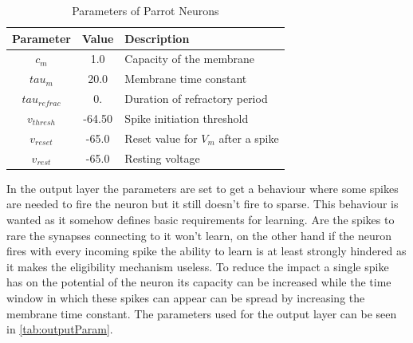 


      


\begin{table}[htpb]
\caption[Parameters Parrot Neuron]{Parameters of Parrot Neurons} \label{tab:parrotPar}
\centering
\begin{tabular}{|c| c |l|}
    \toprule
    Parameter & Value & Description \\
    \midrule
    $c_m$   & 1.0  & Capacity of the membrane \\
    $tau_{m}$    & 20.0  & Membrane time constant \\
    $tau_{refrac}$   & 0.  & Duration of refractory period\\
    $v_{thresh}$   & -64.50  & Spike initiation threshold \\
    $v_{reset}$    & -65.0  &  Reset value for $V_m$ after a spike \\
		$v_{rest}$ & -65.0 & Resting voltage \\
    \bottomrule
\end{tabular}
\end{table}

In the output layer the parameters are set to get a behaviour where some spikes are needed to fire the neuron but it still doesn’t fire to sparse. This behaviour is wanted as it somehow defines basic requirements for learning. Are the spikes to rare the synapses connecting to it won’t learn, on the other hand if the neuron fires with every incoming spike the ability to learn is at least strongly hindered as it makes the eligibility mechanism useless. To reduce the impact a single spike has on the potential of the neuron its capacity can be increased while the time window in which these spikes can appear can be spread by increasing the membrane time constant. The parameters used for the output layer can be seen in \autoref{tab:outputParam}.


